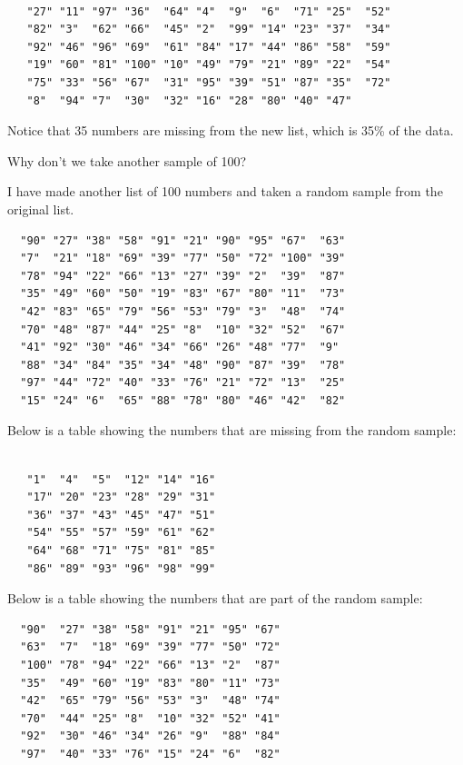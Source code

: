 \documentclass[12pt,twoside]{reedthesis}
\begin{document}
  \begin{verbatim}
  
   "27" "11" "97" "36"  "64" "4"  "9"  "6"  "71" "25"  "52" 
   "82" "3"  "62" "66"  "45" "2"  "99" "14" "23" "37"  "34" 
   "92" "46" "96" "69"  "61" "84" "17" "44" "86" "58"  "59" 
   "19" "60" "81" "100" "10" "49" "79" "21" "89" "22"  "54" 
   "75" "33" "56" "67"  "31" "95" "39" "51" "87" "35"  "72" 
   "8"  "94" "7"  "30"  "32" "16" "28" "80" "40" "47"  
  \end{verbatim}
  
  Notice that 35 numbers are missing from the new list, which is 35\% of
  the data.
  
  Why don't we take another sample of 100?
  
  I have made another list of 100 numbers and taken a random sample from
  the original list.
  
  \begin{verbatim}
  "90" "27" "38" "58" "91" "21" "90" "95" "67"  "63" 
  "7"  "21" "18" "69" "39" "77" "50" "72" "100" "39" 
  "78" "94" "22" "66" "13" "27" "39" "2"  "39"  "87" 
  "35" "49" "60" "50" "19" "83" "67" "80" "11"  "73" 
  "42" "83" "65" "79" "56" "53" "79" "3"  "48"  "74" 
  "70" "48" "87" "44" "25" "8"  "10" "32" "52"  "67" 
  "41" "92" "30" "46" "34" "66" "26" "48" "77"  "9"  
  "88" "34" "84" "35" "34" "48" "90" "87" "39"  "78" 
  "97" "44" "72" "40" "33" "76" "21" "72" "13"  "25" 
  "15" "24" "6"  "65" "88" "78" "80" "46" "42"  "82"
  \end{verbatim}
  
  Below is a table showing the numbers that are missing from the random
  sample:
  
  \begin{verbatim}
  
   "1"  "4"  "5"  "12" "14" "16"
   "17" "20" "23" "28" "29" "31"
   "36" "37" "43" "45" "47" "51"
   "54" "55" "57" "59" "61" "62"
   "64" "68" "71" "75" "81" "85"
   "86" "89" "93" "96" "98" "99"
  \end{verbatim}
  
  \newpage
  
  Below is a table showing the numbers that are part of the random sample:
  
  \begin{verbatim}
  "90"  "27" "38" "58" "91" "21" "95" "67"
  "63"  "7"  "18" "69" "39" "77" "50" "72"
  "100" "78" "94" "22" "66" "13" "2"  "87"
  "35"  "49" "60" "19" "83" "80" "11" "73"
  "42"  "65" "79" "56" "53" "3"  "48" "74"
  "70"  "44" "25" "8"  "10" "32" "52" "41"
  "92"  "30" "46" "34" "26" "9"  "88" "84"
  "97"  "40" "33" "76" "15" "24" "6"  "82"   
  \end{verbatim}
  
\end{document}
